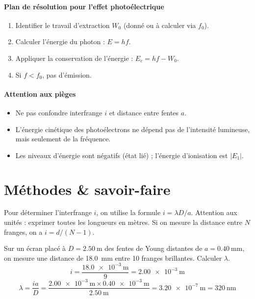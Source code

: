 \begin{synthese}
\paragraph{Plan de résolution pour l'effet photoélectrique}
\begin{enumerate}
  \item Identifier le travail d'extraction \(W_0\) (donné ou à calculer via \(f_0\)).
  \item Calculer l'énergie du photon : \(E = h f\).
  \item Appliquer la conservation de l'énergie : \(E_c = h f - W_0\).
  \item Si \(f < f_0\), pas d'émission.
\end{enumerate}

\paragraph{Attention aux pièges}
\begin{itemize}
  \item Ne pas confondre interfrange \(i\) et distance entre fentes \(a\).
  \item L'énergie cinétique des photoélectrons ne dépend pas de l'intensité lumineuse, mais seulement de la fréquence.
  \item Les niveaux d'énergie sont négatifs (état lié) ; l'énergie d'ionisation est \(|E_1|\).
\end{itemize}
\end{synthese}

\section{Méthodes \& savoir-faire}

Pour déterminer l'interfrange \(i\), on utilise la formule \(i = \lambda D / a\). Attention aux unités : exprimer toutes les longueurs en mètres. Si on mesure la distance entre \(N\) franges, on a \(i = d / (N-1)\).

\begin{exemple}
Sur un écran placé à \(D = \SI{2.50}{\metre}\) des fentes de Young distantes de \(a = \SI{0.40}{\milli\metre}\), on mesure une distance de \SI{18.0}{\milli\metre} entre 10 franges brillantes. Calculer \(\lambda\).
\[
i = \frac{\SI{18.0e-3}{\metre}}{9} = \SI{2.00e-3}{\metre}
\]
\[
\lambda = \frac{i a}{D} = \frac{\SI{2.00e-3}{\metre} \times \SI{0.40e-3}{\metre}}{\SI{2.50}{\metre}} = \SI{3.20e-7}{\metre} = \SI{320}{\nano\metre}
\]
\end{exemple}

